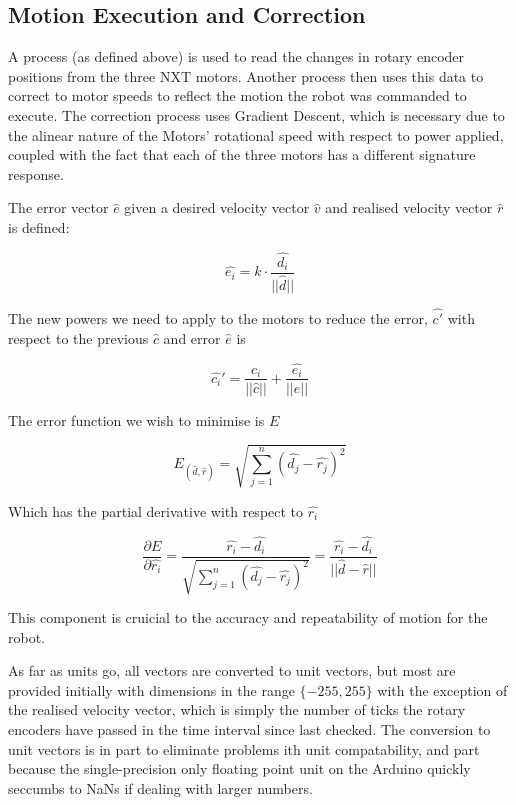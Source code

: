 \subsection{Motion Execution and Correction}

A process (as defined above) is used to read the changes in rotary encoder positions from the three NXT motors. Another process then uses this data to correct to motor speeds to reflect the motion the robot was commanded to execute. The correction process uses Gradient Descent, which is necessary due to the alinear nature of the Motors' rotational speed with respect to power applied, coupled with the fact that each of the three motors has a different signature response.

The error vector $\hat{e}$ given a desired velocity vector $\hat{v}$ and realised velocity vector $\hat{r}$ is defined:

\begin{equation}
  \hat{e_i} = k \cdot \frac{\hat{d_i}}{||\hat{d}||}
\end{equation}

The new powers we need to apply to the motors to reduce the error, $\hat{c'}$ with respect to the previous $\hat{c}$ and error $\hat{e}$ is

\begin{equation}
  \hat{c_i}' = \frac{ \hat{c_i} }{||\hat{c}||} + \frac{ \hat{e_i} }{||\hat{e}||}
\end{equation}

The error function we wish to minimise is $E$

\begin{equation}
  E_{(\hat{d},\hat{r})} = \sqrt{\sum_{j=1}^{n} (\hat{d_j} - \hat{r_j})^2}
\end{equation}

Which has the partial derivative with respect to $\hat{r_i}$

\begin{equation}
  \frac{\partial E}{\partial \hat{r_i}}
  =
  \frac{\hat{r_i} - \hat{d_i}}{\sqrt{\sum_{j=1}^{n} (\hat{d_j} - \hat{r_j})^2}}
  =
  \frac{\hat{r_i} - \hat{d_i}}{||\hat{d}-\hat{r}||}
\end{equation}

This component is cruicial to the accuracy and repeatability of motion for the robot.

As far as units go, all vectors are converted to unit vectors, but most are provided initially with dimensions in the range ${\{-255,255\}}$ with the exception of the realised velocity vector, which is simply the number of ticks the rotary encoders have passed in the time interval since last checked. The conversion to unit vectors is in part to eliminate problems ith unit compatability, and part because the single-precision only floating point unit on the Arduino quickly seccumbs to NaNs if dealing with larger numbers. 

